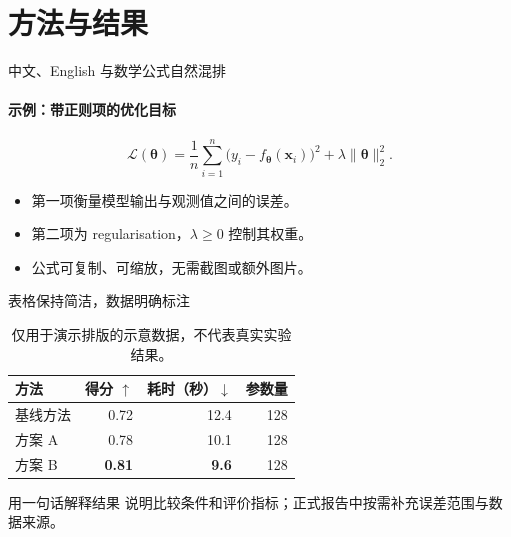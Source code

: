 \documentclass[aspectratio=169,11pt,t]{beamer}
\begin{document}
\section{方法与结果}

\begin{frame}{中文、English 与数学公式自然混排}
  \framesubtitle{示例：带正则项的优化目标}
  \[
    \mathcal{L}(\boldsymbol{\theta})
      = \frac{1}{n}\sum_{i=1}^{n}
        \bigl(y_i-f_{\boldsymbol{\theta}}(\mathbf{x}_i)\bigr)^2
        + \lambda\lVert\boldsymbol{\theta}\rVert_2^2.
  \]
  \begin{itemize}
    \item 第一项衡量模型输出与观测值之间的误差。
    \item 第二项为 regularisation，$\lambda\geq0$ 控制其权重。
    \item 公式可复制、可缩放，无需截图或额外图片。
  \end{itemize}
\end{frame}

\begin{frame}{表格保持简洁，数据明确标注}
  \begin{table}
    \centering
    \renewcommand{\arraystretch}{1.25}
    \begin{tabular}{lrrr}
      \toprule
      方法 & 得分 $\uparrow$ & 耗时（秒）$\downarrow$ & 参数量 \\
      \midrule
      基线方法 & 0.72 & 12.4 & 128 \\
      方案 A & 0.78 & 10.1 & 128 \\
      方案 B & \textbf{0.81} & \textbf{9.6} & 128 \\
      \bottomrule
    \end{tabular}
    \caption{仅用于演示排版的示意数据，不代表真实实验结果。}
  \end{table}
  \begin{block}{用一句话解释结果}
    说明比较条件和评价指标；正式报告中按需补充误差范围与数据来源。
  \end{block}
\end{frame}
\end{document}
